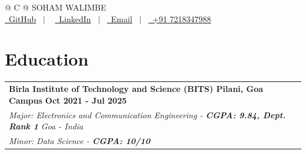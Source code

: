 \documentclass[letterpaper,11pt]{article}
\begin{document}
\begin{tabularx}{\linewidth}{@{} C @{}}
\Huge{SOHAM WALIMBE} \\[7.5pt]
\href{https://github.com/Sohamwalimbe}{\raisebox{-0.05\height}\faGithub\ GitHub} \ $|$ \
\href{https://www.linkedin.com/in/soham-walimbe-41ba49247/}{\raisebox{-0.05\height}\faLinkedin\ LinkedIn} \ $|$ \  
\href{mailto:sohamwalimbe15@gmail.com}{\raisebox{-0.05\height}\faEnvelope \ Email} \ $|$ \ 
\href{tel:+91 7218347988}{\raisebox{-0.05\height}\faMobile \ +91 7218347988} \\
\end{tabularx}




\vspace{0.3em}
\section{Education} 
\begin{tabularx}{\linewidth}{@{} X@{}}	
    \textbf{Birla Institute of Technology and Science (BITS) Pilani, Goa Campus}  \hfill \textbf{Oct 2021 - Jul 2025} \\
    \textit{Major: Electronics and Communication Engineering  - {\textbf{CGPA: 9.84, Dept. Rank 1}}} \hfill \small\textit{Goa - India} \\
    \textit{Minor: Data Science - \textbf{CGPA: 10/10} } 
\end{tabularx}
\end{document}
